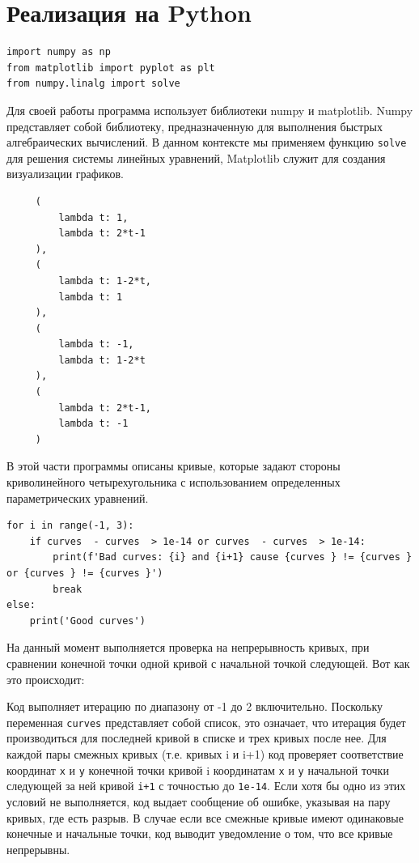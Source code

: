 \documentclass[a4paper,14pt,russian]{extreport}
\renewcommand{\_}{\kern-1.5pt\textunderscore\kern-1.5pt}
\begin{document}
\section{Реализация на Python}
\begin{verbatim}
import numpy as np
from matplotlib import pyplot as plt
from numpy.linalg import solve
\end{verbatim}

Для своей работы программа использует библиотеки numpy и matplotlib. Numpy представляет собой библиотеку, предназначенную для выполнения быстрых алгебраических вычислений. В данном контексте мы применяем функцию \texttt{solve} для решения системы линейных уравнений, Matplotlib служит для создания визуализации графиков.

\begin{verbatim}
     (
         lambda t: 1,
         lambda t: 2*t-1
     ),
     (
         lambda t: 1-2*t,
         lambda t: 1
     ),
     (
         lambda t: -1,
         lambda t: 1-2*t
     ),
     (
         lambda t: 2*t-1,
         lambda t: -1
     )
\end{verbatim}

В этой части программы описаны кривые, которые задают стороны криволинейного четырехугольника с использованием определенных параметрических уравнений.

\begin{verbatim}
for i in range(-1, 3):
    if curves  - curves  > 1e-14 or curves  - curves  > 1e-14:
        print(f'Bad curves: {i} and {i+1} cause {curves } != {curves } or {curves } != {curves }')
        break
else:
    print('Good curves')
\end{verbatim}

На данный момент выполняется проверка на непрерывность кривых, при сравнении конечной точки одной кривой с начальной точкой следующей. Вот как это происходит:

Код выполняет итерацию по диапазону от -1 до 2 включительно. Поскольку переменная \texttt{curves} представляет собой список, это означает, что итерация будет производиться для последней кривой в списке и трех кривых после нее. Для каждой пары смежных кривых (т.е. кривых i и i+1) код проверяет соответствие координат \texttt{x} и \texttt{y} конечной точки кривой i координатам \texttt{x} и \texttt{y} начальной точки следующей за ней кривой \texttt{i+1} с точностью до \texttt{1e-14}. Если хотя бы одно из этих условий не выполняется, код выдает сообщение об ошибке, указывая на пару кривых, где есть разрыв. В случае если все смежные кривые имеют одинаковые конечные и начальные точки, код выводит уведомление о том, что все кривые непрерывны.
\end{document}
